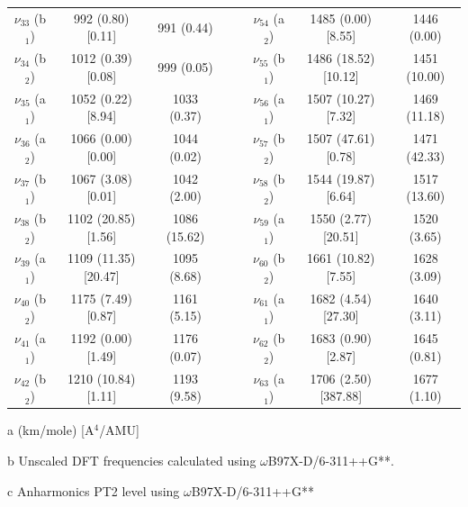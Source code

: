\begin{table}[H]
\begin{center}
\begin{threeparttable}
{\begin{tabular}{c c c c c c c c}
$\nu_{33}$ (b$_{1}$) & 992 (0.80) [0.11] & 991 (0.44) &  &  & $\nu_{54}$ (a$_{2}$) & 1485 (0.00) [8.55] & 1446 (0.00) \\ 
$\nu_{34}$ (b$_{2}$) & 1012 (0.39) [0.08] & 999 (0.05) &  &  & $\nu_{55}$ (b$_{1}$) & 1486  (18.52) [10.12] & 1451 (10.00) \\ 
$\nu_{35}$ (a$_{1}$) & 1052 (0.22) [8.94] & 1033 (0.37) &  &  & $\nu_{56}$ (a$_{1}$) & 1507 (10.27) [7.32] & 1469 (11.18) \\ 
$\nu_{36}$ (a$_{2}$) & 1066 (0.00) [0.00] & 1044 (0.02) &  &  & $\nu_{57}$ (b$_{2}$) & 1507 (47.61) [0.78] & 1471 (42.33) \\ 
$\nu_{37}$ (b$_{1}$) & 1067 (3.08) [0.01] & 1042 (2.00) &  &  & $\nu_{58}$ (b$_{2}$) & 1544 (19.87) [6.64] & 1517 (13.60) \\ 
$\nu_{38}$ (b$_{2}$) & 1102 (20.85) [1.56] & 1086 (15.62) &  &  & $\nu_{59}$ (a$_{1}$) & 1550 (2.77) [20.51] & 1520 (3.65) \\ 
$\nu_{39}$ (a$_{1}$) & 1109 (11.35) [20.47] & 1095 (8.68) &  &  & $\nu_{60}$ (b$_{2}$) & 1661 (10.82) [7.55] & 1628 (3.09) \\ 
$\nu_{40}$ (b$_{2}$) & 1175 (7.49) [0.87] & 1161 (5.15) &  &  & $\nu_{61}$ (a$_{1}$) & 1682 (4.54) [27.30] & 1640 (3.11) \\ 
$\nu_{41}$ (a$_{1}$) & 1192 (0.00) [1.49] & 1176 (0.07) &  &  & $\nu_{62}$ (b$_{2}$) & 1683 (0.90) [2.87] & 1645 (0.81) \\ 
$\nu_{42}$ (b$_{2}$) & 1210 (10.84) [1.11] & 1193 (9.58) &  &  & $\nu_{63}$ (a$_{1}$) & 1706 (2.50) [387.88] & 1677 (1.10) \\ 
	\bottomrule
\end{tabular}}

\begin{tablenotes}
	\item[a] (km/mole) [A$^{4}$/AMU]
	\item[b] Unscaled DFT frequencies calculated using $\omega$B97X-D/6-311++G**.
	\item[c] Anharmonics PT2 level using $\omega$B97X-D/6-311++G** 
\end{tablenotes}
\end{threeparttable}
\end{center}
\label{freq-4,6-dimethyldibenzofuran}
\end{table}





